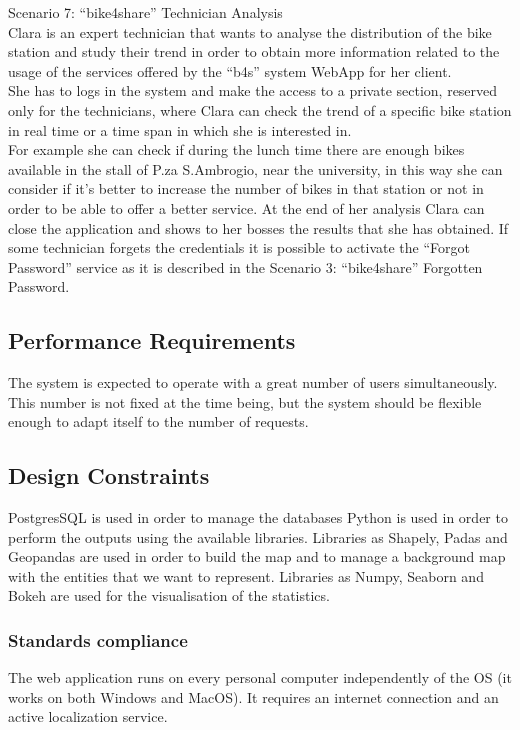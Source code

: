 \documentclass{article}
\begin{document}
Scenario 7: “bike4share” Technician Analysis \\
Clara is an expert technician that wants to analyse the distribution of the bike station and study their trend in order to obtain more information related to the usage of the services offered by the “b4s” system WebApp for her client.\\
She has to logs in the system and make the access to a private section, reserved only for the technicians, where Clara can check the trend of a specific bike station in real time or a time span in which she is interested in.\\ For example she can check if during the lunch time there are enough bikes available in the stall of P.za S.Ambrogio, near the university, in this way she can consider if it’s better to increase the number of bikes in that station or not in order to be able to offer a better service.
At the end of her analysis Clara can close the application and shows to her bosses the results that she has obtained.
If some technician forgets the credentials it is possible to activate the “Forgot Password” service as it is described in the Scenario 3: “bike4share” Forgotten Password.

\subsection{Performance Requirements}
The system is expected to operate with a great number of users simultaneously. This number is not fixed at the time being, but the system should be flexible enough to adapt itself to the number of requests.
\subsection{Design Constraints}
PostgresSQL is used in order to manage the databases
Python is used in order to perform the outputs using the available libraries. 
Libraries as Shapely, Padas and Geopandas are used in order to build the map and to manage a background map with the entities that we want to represent.
Libraries as Numpy, Seaborn and Bokeh are used for the visualisation of the statistics. 
\subsubsection{Standards compliance} The web application runs on every personal computer independently of the OS (it works on both Windows and MacOS). It requires an internet connection and an active localization service.  
\end{document}

